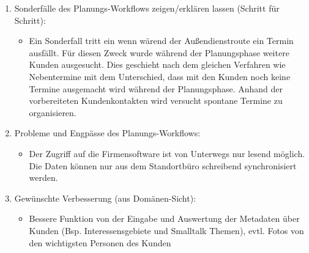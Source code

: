 \documentclass[Bachelorarbeit.tex]{subfiles}
\begin{document}
\begin{enumerate}
	\item Sonderfälle des Planungs-Workflows zeigen/erklären lassen (Schritt für Schritt):
	\begin{itemize}
		\item[] Ein Sonderfall tritt ein wenn wärend der Außendienstroute ein Termin ausfällt. Für diesen Zweck wurde während der Planungsphase weitere Kunden ausgesucht. Dies geschieht nach dem gleichen Verfahren wie Nebentermine mit dem Unterschied, dass  mit den Kunden noch keine Termine ausgemacht wird während der Planungsphase. Anhand der vorbereiteten Kundenkontakten wird versucht spontane Termine zu organisieren.
	\end{itemize}
	\item Probleme und Engpässe des Planungs-Workflows:
	\begin{itemize}
		\item[] Der Zugriff auf die Firmensoftware ist von Unterwegs nur lesend möglich. Die Daten können nur aus dem Standortbüro schreibend synchronisiert werden.
	\end{itemize}
	\item Gewünschte Verbesserung (aus Domänen-Sicht):
	\begin{itemize}
		\item[] Bessere Funktion von der Eingabe und Auswertung der Metadaten über Kunden (Bsp. Interessensgebiete und Smalltalk Themen), evtl. Fotos von den wichtigsten Personen des Kunden 
	\end{itemize}
\end{enumerate}
\end{document}
